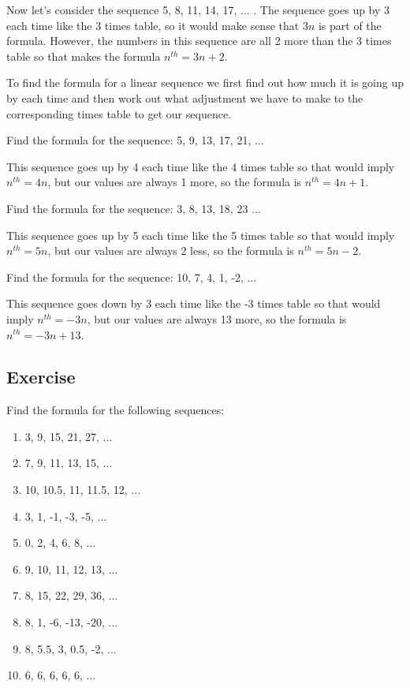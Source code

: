 Now let's consider the sequence 5, 8, 11, 14, 17, ... .  The sequence goes up by 3 each time like the 3 times table, so it would make sense that $3n$ is part of the formula.  However, the numbers in this sequence are all 2 more than the 3 times table so that makes the formula $n^{th}=3n+2$.

\bigskip

To find the formula for a linear sequence we first find out how much it is going up by each time and then work out what adjustment we have to make to the corresponding times table to get our sequence.

\begin{exmp}
Find the formula for the sequence: 5, 9, 13, 17, 21, ...

\bigskip

This sequence goes up by 4 each time like the 4 times table so that would imply $n^{th}=4n$, but our values are always 1 more, so the formula is $n^{th}=4n+1$.
\end{exmp}

\begin{exmp}
Find the formula for the sequence: 3, 8, 13, 18, 23 ...

\bigskip

This sequence goes up by 5 each time like the 5 times table so that would imply $n^{th}=5n$, but our values are always 2 less, so the formula is $n^{th}=5n-2$.
\end{exmp}

\begin{exmp}
Find the formula for the sequence: 10, 7, 4, 1, -2, ...

\bigskip

This sequence goes down by 3 each time like the -3 times table so that would imply $n^{th}=-3n$, but our values are always 13 more, so the formula is $n^{th}=-3n+13$.
\end{exmp}
\subsection{Exercise}
Find the formula for the following sequences:
\begin{enumerate}
	\item 3, 9, 15, 21, 27, ...
	\item 7, 9, 11, 13, 15, ...
	\item 10, 10.5, 11, 11.5, 12, ...
	\item 3, 1, -1, -3, -5, ...
	\item 0, 2, 4, 6, 8, ...
	\item 9, 10, 11, 12, 13, ...
	\item 8, 15, 22, 29, 36, ...
	\item 8, 1, -6, -13, -20, ...
	\item 8, 5.5, 3, 0.5, -2, ...
	\item 6, 6, 6, 6, 6, ...	
\end{enumerate}
